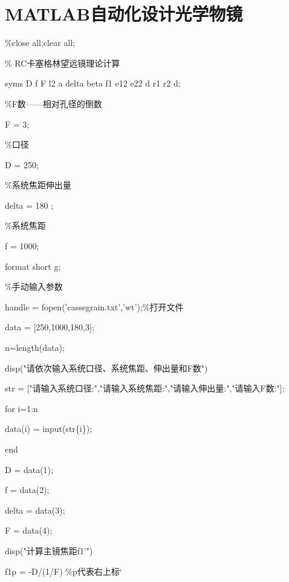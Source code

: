 
\chapter{MATLAB自动化设计光学物镜}


		\%close all;clear all;
		
		\% RC卡塞格林望远镜理论计算
		
		syms D f F l2 a delta beta f1 e12 e22 d r1 r2 d;
		
		\%F数——相对孔径的倒数
		
		F = 3;
		
		\%口径
		
		D = 250;
		
		\%系统焦距伸出量
		
		delta = 180 ;
		
		\%系统焦距
		
		f = 1000;
		
		format short g;
		
		\%手动输入参数
		
		handle = fopen('cassegrain.txt','wt');\%打开文件
		
		data = [250,1000,180,3];
		
		n=length(data);
		
		disp("请依次输入系统口径、系统焦距、伸出量和F数")
		
		str = ["请输入系统口径:","请输入系统焦距:","请输入伸出量:","请输入F数:"]; 
		
		for i=1:n
		
		data(i) = input(str\{i\});
		
		end
		
		D = data(1);
		
		f = data(2);
		
		delta = data(3);
		
		F = data(4);
		
		disp("计算主镜焦距f1'")
		
		f1p = -D/(1/F) \%p代表右上标‘
		
